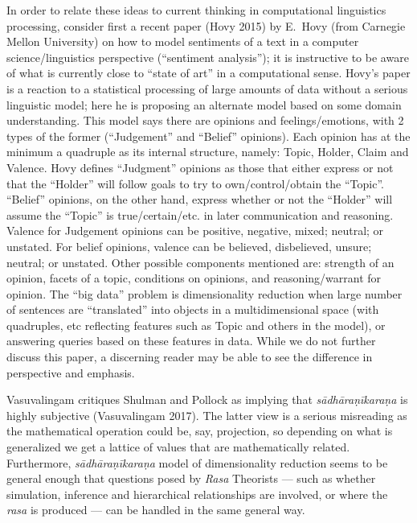 In order to relate these ideas to current thinking in computational linguistics processing, consider first a recent paper (Hovy 2015) by E.~Hovy (from Carnegie Mellon University) on how to model sentiments of a text in a computer science/linguistics perspective (“sentiment analysis”); it is instructive to be aware of what is currently close to “state of art” in a computational sense. Hovy’s paper is a reaction to a statistical processing of large amounts of data without a serious linguistic model; here he is proposing an alternate model based on some domain understanding. This model says there are opinions and feelings/emotions, with 2 types of the former (“Judgement” and “Belief” opinions). Each opinion has at the minimum a quadruple as its internal structure, namely: Topic, Holder, Claim and Valence. Hovy defines “Judgment” opinions as those that either express or not that the “Holder” will follow goals to try to own/control/obtain the “Topic”. “Belief” opinions, on the other hand, express whether or not the “Holder” will assume the “Topic” is true/certain/etc. in later communication and reasoning. Valence for Judgement opinions can be positive, negative, mixed; neutral; or unstated. For belief opinions, valence can be believed, disbelieved, unsure; neutral; or unstated. Other possible components mentioned are: strength of an opinion, facets of a topic, conditions on opinions, and reasoning/warrant for opinion. The “big data” problem is dimensionality reduction when large number of sentences are “translated” into objects in a multidimensional space (with quadruples, etc reflecting features such as Topic and others in the model), or answering queries based on these features in data. While we do not further discuss this paper, a discerning reader may be able to see the difference in perspective and emphasis.

Vasuvalingam critiques Shulman and Pollock as implying that \textsl{sādhāraṇīkaraṇa} is highly subjective (Vasuvalingam 2017). The latter view is a serious misreading as the mathematical operation could be, say, projection, so depending on what is generalized we get a lattice of values that are mathematically related. Furthermore, \textsl{sādhāraṇīkaraṇa} model of dimensionality reduction seems to be general enough that questions posed by \textsl{Rasa} Theorists --- such as whether simulation, inference and hierarchical relationships are involved, or where the \textsl{rasa} is produced --- can be handled in the same general way.


